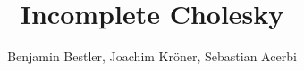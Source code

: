 \documentclass[paper=a4,11pt,oneside]{article}
\theoremstyle{definition}
\theoremstyle{definition}
\theoremstyle{definition}
\theoremstyle{definition}
\theoremstyle{definition}
\theoremstyle{definition}
\theoremstyle{definition}
\theoremstyle{remark}
\theoremstyle{definition}
\begin{document}
\newpage
\title{Incomplete Cholesky}
\author{Benjamin Bestler, Joachim Kr\"oner, Sebastian Acerbi}
\thispagestyle{empty} 

\maketitle
\tableofcontents



\end{document}
